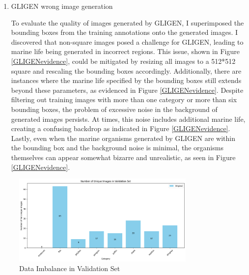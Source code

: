 \documentclass[10pt,a4paper]{article}
\begin{document}
\begin{enumerate}[(a)]
\begin{enumerate}[(1)]
\item GLIGEN wrong image generation

To evaluate the quality of images generated by GLIGEN, I superimposed the bounding boxes from the training annotations onto the generated images. I discovered that non-square images posed a challenge for GLIGEN, leading to marine life being generated in incorrect regions. This issue, shown in Figure \ref{GLIGENevidence}, could be mitigated by resizing all images to a 512*512 square and rescaling the bounding boxes accordingly. Additionally, there are instances where the marine life specified by the bounding boxes still extends beyond these parameters, as evidenced in Figure \ref{GLIGENevidence}. Despite filtering out training images with more than one category or more than six bounding boxes, the problem of excessive noise in the background of generated images persists. At times, this noise includes additional marine life, creating a confusing backdrop as indicated in Figure \ref{GLIGENevidence}. Lastly, even when the marine organisms generated by GLIGEN are within the bounding box and the background noise is minimal, the organisms themselves can appear somewhat bizarre and unrealistic, as seen in Figure \ref{GLIGENevidence}.
\end{enumerate}

\begin{figure}[H]
\centering
\includegraphics[width=0.8\textwidth]{figure/validation_barplot.png}
\caption{Data Imbalance in Validation Set}
\label{fig:ValSetBarPlot}
\end{figure}


\end{enumerate}
\end{document}
